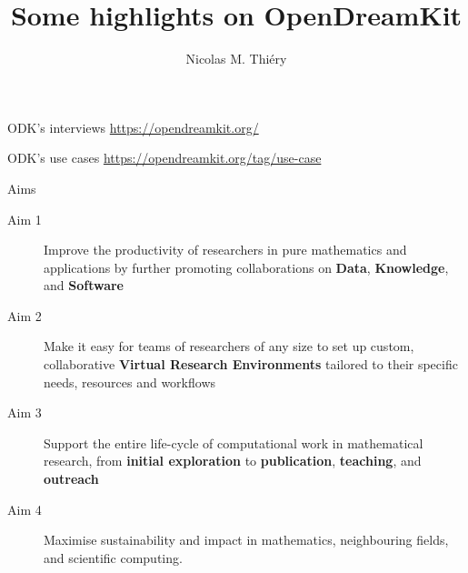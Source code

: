 \documentclass{beamer}
\author{Nicolas M. Thiéry}
\title{Some highlights on OpenDreamKit}
\begin{document}
\begin{frame}
  \titlepage
\end{frame}

\begin{frame}{ODK's interviews}
  \url{https://opendreamkit.org/}
\end{frame}

\begin{frame}{ODK's use cases}
  \url{https://opendreamkit.org/tag/use-case}
\end{frame}

\begin{frame}{Aims}
  \begin{description}
  \item[Aim 1] Improve the productivity of researchers in pure mathematics and
    applications by further promoting collaborations on \textbf{Data},
    \textbf{Knowledge}, and \textbf{Software}
    \bigskip
  \item[Aim 2] Make it easy for teams of researchers of any size to set up
    custom, collaborative \textbf{Virtual Research Environments}
    tailored to their specific needs, resources and workflows
    \bigskip
  \item[Aim 3] Support the entire life-cycle of computational work in
    mathematical research, from \textbf{initial exploration} to
    \textbf{publication}, \textbf{teaching}, and \textbf{outreach}
    \bigskip
  \item[Aim 4] Maximise sustainability and impact in mathematics,
    neighbouring fields, and scientific computing.
  \end{description}
\end{frame}
\end{document}
